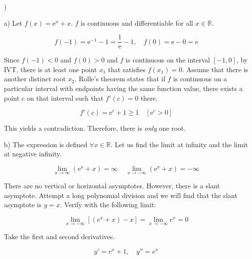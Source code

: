 \documentclass{article}
\begin{document}
)

\hfill

\noindent a) Let $f(x) = \mathrm{e}^x + x$. $f$ is continuous and differentiable for all $x\in\mathbb{R}$.

\begin{equation*}
    f(-1) = \mathrm{e}^{-1} -1 = \frac1{\mathrm{e}} - 1, \quad f(0) = \mathrm{e} - 0 = \mathrm{e}
\end{equation*}

\hfill

\noindent Since $f(-1) < 0$ and $f(0) > 0$ and $f$ is continuous on the interval $[-1, 0]$, by IVT, there is at least one point $x_1$ that satisfies $f(x_1) = 0$. Assume that there is another distinct root $x_2$. Rolle's theorem states that if $f$ is continuous on a particular interval with endpoints having the same function value, there exists a point $c$ on that interval such that $f'(c) = 0$ there.

\begin{equation*}
f'(c) = \mathrm{e}^c + 1 \geq 1 \quad [\mathrm{e}^c > 0]
\end{equation*}

\hfill

\noindent This yields a contradiction. Therefore, there is \textit{only} one root.

\hfill

\noindent b) The expression is defined $\forall x\in \mathbb{R}$. Let us find the limit at infinity and the limit at negative infinity.

\begin{equation*}\lim_{x\to \infty}(\mathrm{e}^x+x)=\infty\,\quad\lim_{x\to -\infty}(\mathrm{e}^x+x)=-\infty\end{equation*}

\hfill

\noindent There are no vertical or horizontal asymptotes. However, there is a slant asymptote. Attempt a long polynomial division and we will find that the slant asymptote is $y=x$. Verify with the following limit:

\begin{equation*}\lim_{x\to-\infty}\left[(e^x+x)-x\right]=\lim_{x\to-\infty}e^x=0\end{equation*}

\hfill 

\noindent Take the first and second derivatives.

\begin{equation*}y' = e^x + 1,\quad y'' = e^x\end{equation*}
\end{document}
